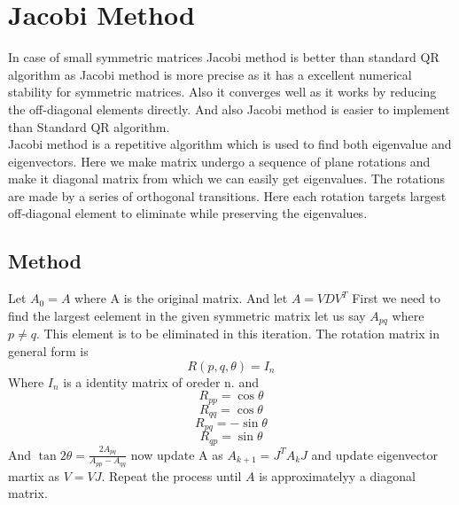 \documentclass[a4paper,12pt]{article}
\begin{document}
\section{Jacobi Method}
In case of small symmetric matrices Jacobi method is better than standard QR algorithm as Jacobi method is more precise as it has a excellent numerical stability for symmetric matrices. Also it converges well as it works by reducing the off-diagonal elements directly. And also Jacobi method is easier to implement than Standard QR algorithm.\\
Jacobi method is a repetitive algorithm which is used to find both eigenvalue and eigenvectors. Here we make matrix undergo a sequence of plane rotations and make it diagonal matrix from which we can easily get eigenvalues. The rotations are made by a series of orthogonal transitions. Here each rotation targets largest off-diagonal element to eliminate while preserving the eigenvalues. 
\subsection{Method}
Let $A_0=A$ where  A is the original matrix. And let $A=VDV^T$
First we need to find the largest eelement in the given symmetric matrix let us say $A_{pq}$ where $p\neq q$. This element is to be eliminated in this iteration. The rotation matrix in general form is 
$$R(p,q,\theta)=I_n$$
Where $I_n$ is a identity matrix of oreder n. and  $$R_{pp}=\cos \theta$$$$R_{qq}=\cos \theta$$ $$R_{pq}=-\sin \theta$$$$R_{qp}=\sin \theta$$
And $\tan 2\theta =\frac{2A_{pq}}{A_{pp}-A_{qq}}$
now update A as $A_{k+1}=J^TA_{k}J$ and update eigenvector martix as $V=VJ$. Repeat the process until $A$ is approximatelyy a diagonal matrix. 
\end{document}
